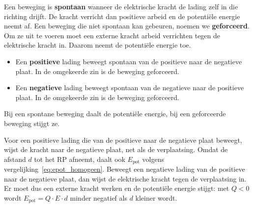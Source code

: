 \documentclass{ximera}
\begin{document}
Een beweging is \textbf{spontaan} wanneer de elektrische kracht de lading zelf in die richting drijft. De kracht verricht dan positieve arbeid en de potentiële energie neemt af. Een beweging die niet spontaan kan gebeuren, noemen we \textbf{geforceerd}. Om ze uit te voeren moet een externe kracht arbeid verrichten tegen de elektrische kracht in. Daarom neemt de potentiële energie toe.

\begin{proposition}[foldable=true,title={Spontane beweging in een homogeen veld}]\nl
\begin{itemize}
    \item Een \textbf{positieve} lading beweegt spontaan van de positieve naar de negatieve plaat. In de omgekeerde zin is de beweging geforceerd.
    \item Een \textbf{negatieve} lading beweegt spontaan van de negatieve naar de positieve plaat. In de omgekeerde zin is de beweging geforceerd.
\end{itemize}
Bij een spontane beweging daalt de potentiële energie, bij een geforceerde beweging stijgt ze.
\end{proposition}

Voor een positieve lading die van de positieve naar de negatieve plaat beweegt, wijst de kracht naar de negatieve plaat, net als de verplaatsing. Omdat de afstand $d$ tot het RP afneemt, daalt ook $E_{\text{pot}}$ volgens vergelijking~\ref{eq:epot_homogeen}. Beweegt een negatieve lading van de positieve naar de negatieve plaat, dan wijst de elektrische kracht tegen de verplaatsing in. Er moet dus een externe kracht werken en de potentiële energie stijgt: met $Q < 0$ wordt $E_{\text{pot}} = Q \cdot E \cdot d$ minder negatief als $d$ kleiner wordt.
\end{document}
